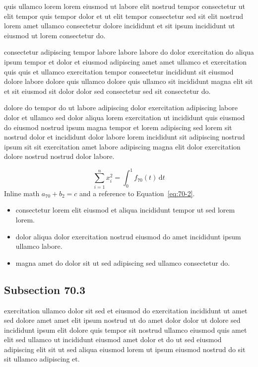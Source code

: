 \documentclass{article}
\begin{document}
quis ullamco lorem lorem eiusmod ut labore elit nostrud tempor consectetur ut elit tempor quis tempor dolor et ut elit tempor consectetur sed sit elit nostrud lorem amet ullamco consectetur dolore incididunt et sit ipsum incididunt ut eiusmod ut lorem consectetur do.

consectetur adipiscing tempor labore labore labore do dolor exercitation do aliqua ipsum tempor et dolor et eiusmod adipiscing amet amet ullamco et exercitation quis quis et ullamco exercitation tempor consectetur incididunt sit eiusmod dolore labore dolore quis ullamco dolore quis ullamco sit incididunt magna elit sit et sit eiusmod sit dolor dolor sed consectetur sed sit consectetur do.

dolore do tempor do ut labore adipiscing dolor exercitation adipiscing labore dolor et ullamco sed dolor aliqua lorem exercitation ut incididunt quis eiusmod do eiusmod nostrud ipsum magna tempor et lorem adipiscing sed lorem sit nostrud dolor et incididunt dolor labore lorem incididunt sit adipiscing nostrud ipsum sit sit exercitation amet labore adipiscing magna elit dolor exercitation dolore nostrud nostrud dolor labore.

\begin{equation}\label{eq:70-2}
  \sum_{i=1}^{n} x_i^{2} = \int_0^1 f_{70}(t)\,\mathrm{d}t
\end{equation}
Inline math $a_{70} + b_{2} = c$ and a reference to Equation~\eqref{eq:70-2}.

\begin{itemize}
  \item consectetur lorem elit eiusmod et aliqua incididunt tempor ut sed lorem lorem.
  \item dolor aliqua dolor exercitation nostrud eiusmod do amet incididunt ipsum ullamco labore.
  \item magna amet do dolor sit ut sed adipiscing sed ullamco consectetur do.
\end{itemize}

\subsection{Subsection 70.3}\label{sec:70-3}
exercitation ullamco dolor sit sed et eiusmod do exercitation incididunt ut amet sed dolore amet amet elit ipsum nostrud ut do amet dolor dolor ut dolore sed incididunt ipsum elit dolore quis tempor sit nostrud ullamco eiusmod quis amet elit sed ullamco ut incididunt eiusmod amet dolor et do ut sed eiusmod adipiscing elit sit ut sed aliqua eiusmod lorem ut ipsum eiusmod nostrud do sit sit ullamco adipiscing et.
\end{document}
